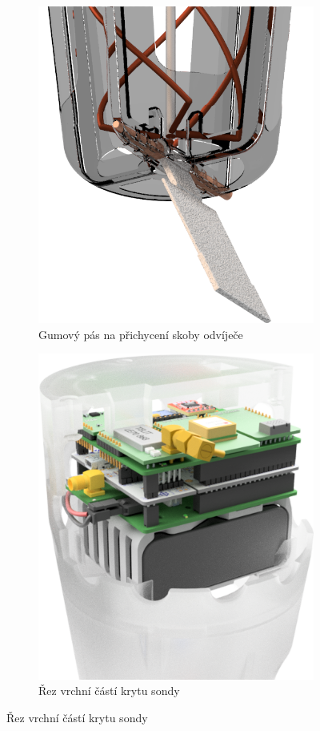 \documentclass[twoside]{ctuthesis}
\theoremstyle{plain}
\theoremstyle{definition}
\theoremstyle{note}
\begin{document}
	\begin{figure}[hbtp]
		\centering
		\begin{subfigure}{.49\textwidth}
			\centering
			\includegraphics[height=.7\textwidth]{Figures/sonda_guma.png}
			\caption{Gumový pás na přichycení skoby odvíječe}
			\label{fig:sonda:guma}
		\end{subfigure}%
		\begin{subfigure}{.49\textwidth}
			\centering
			\includegraphics[height=.7\linewidth]{Figures/ALL_rez_white.png}
			\caption{Řez vrchní částí krytu sondy}
			\label{fig:all:rez}
		\end{subfigure}
		\label{fig:shields}
	\end{figure}

	
	
\end{document}
